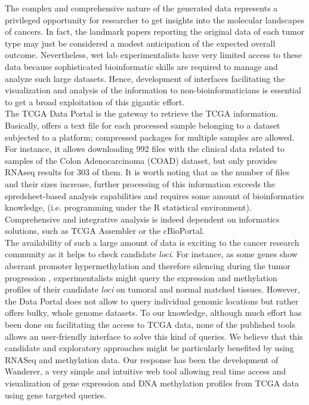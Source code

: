 \documentclass{article}
\begin{document}
The complex and comprehensive  nature of the generated data represents a privileged opportunity for researcher to get insights into the molecular landscapes of cancers. In fact, the landmark papers reporting the original data of each tumor type may just be considered a modest anticipation of the expected overall outcome. Nevertheless,  wet lab experimentalists have very limited access to these data because sophisticated bioinformatic skills are required to manage and analyze such large datasets. Hence, development of interfaces facilitating the visualization and analysis of the information to non-bioinformaticians is essential to get a broad exploitation of this gigantic effort.\\

The TCGA Data Portal is the gateway to retrieve the TCGA information. Basically, offers a text file for each processed sample belonging to a dataset subjected to a platform; compressed packages for multiple samples are allowed. For instance, it allows downloading 992 files with the clinical data related to samples of the Colon Adenocarcinoma (COAD) dataset, but only provides RNAseq results for 303 of them. It is worth noting that as the number of files and their sizes increase, further processing of this information exceeds the spredsheet-based analysis capabilities and requires some amount of bioinformatics knowledge, (i.e. programming under the R statistical environment). Comprehensive and integrative analysis is indeed dependent on informatics solutions, such as TCGA Assembler \cite{zhu2014tcga} or the cBioPortal\cite{gao2013integrative}.\\


The availability of such a large amount of data is exciting to the cancer research community as it helps to check candidate \textit{loci}. For instance, as some genes show aberrant promoter hypermethylation and therefore silencing during the tumor progression \cite{jones2002fundamental}, experimentalists might query the expression and methylation profiles of their candidate \textit{loci} on tumoral and normal matched tissues. However, the Data Portal does not allow to query individual genomic locations but rather offers bulky, whole genome datasets. To our knowledge, although much effort has been done on facilitating the access to TCGA data, none of the published tools allows an user-friendly interface to solve this kind of queries. We believe that this candidate and exploratory approaches might be particularly benefited by using RNASeq and methylation data. Our response has been the development of Wanderer, a very simple and intuitive web tool allowing real time access and visualization of gene expression and DNA methylation profiles from TCGA data using gene targeted queries.\\
\end{document}

